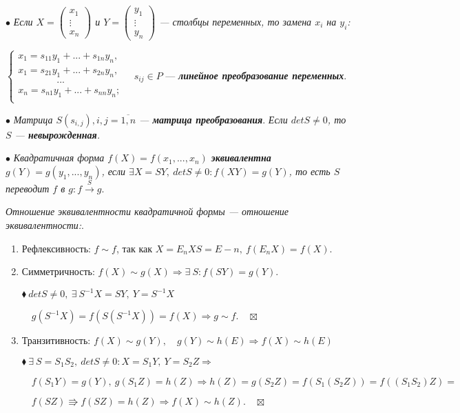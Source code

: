 \documentclass[a4paper, 12pt]{report}
\begin{document}
	$\bullet$ \textit{Если $X = \begin{pmatrix} x_1 \\ \vdots \\ x_n \end{pmatrix}$ и $Y = \begin{pmatrix} y_1 \\ \vdots \\ y_n \end{pmatrix}$ --- столбцы переменных, то замена $x_i$ на $y_i$:}
	\par\bigskip
	$\begin{cases} x_1 = s_{11} y_1 + ... + s_{1n} y_n, \\ x_1 = s_{21} y_1 + ... + s_{2n} y_n, \\ \qquad\qquad... \\ x_n = s_{n1} y_1 + ... + s_{nn} y_n; \\ \end{cases} \quad s_{ij} \in P$ --- \textit{\textbf{линейное преобразование переменных}}.
	\par\bigskip
	$\bullet$\textit{ Матрица $S(s_{i,j}), i,j = \overline{1,n}$ --- \textbf{матрица преобразования}}.
	\textit{Если $det S \ne 0$, то $S$ --- \textbf{невырожденная}.}
	\par\bigskip
	$\bullet$ \textit{Квадратичная форма $f(X) = f(x_1, ..., x_n)$ \textbf{эквивалентна} $g(Y) = g(y_1, ..., y_n)$, если $\exists X = SY,\ det S \ne 0 : f(XY) = g(Y)$, то есть $S$ переводит $f$ в $g : f  \xrightarrow{S} g$}.
	\par\bigskip
	\textit{Отношение эквивалентности квадратичной формы --- отношение эквивалентности:}.
	\begin{enumerate}
		\item Рефлексивность: $f \sim f$, так как $X = E_n X S = E-n,\ f(E_n X) = f(X)$.
		\item Симметричность: $f(X) \sim g(X) \Rightarrow \exists\ S: f(SY) = g(Y)$.
		
		$\blacklozenge\ det S \ne 0,\ \exists\ S^{-1} X = SY,\ Y = S^{-1}X$
		
		$\quad g(S^{-1} X) = f(S(S^{-1}X)) = f(X) \Rightarrow g \sim f. \quad \boxtimes$
		\item Транзитивность: $f(X) \sim g(Y), \quad g(Y) \sim h(E) \Rightarrow f(X) \sim h(E)$
		
		$\blacklozenge\ \exists\ S=S_1S_2,\ det S \ne 0: X = S_1 Y,\ Y = S_2 Z \Rightarrow $
		
		$\quad f(S_1Y) = g(Y),\ g(S_1Z) = h(Z)\Rightarrow h(Z) = g(S_2Z) = f(S_1(S_2Z)) = f((S_1S_2)Z) = $
		
		$\quad f(SZ) \Rrightarrow f(SZ) = h(Z) \Rightarrow f(X) \sim h(Z). \quad \boxtimes$
	\end{enumerate}
	
\end{document}
